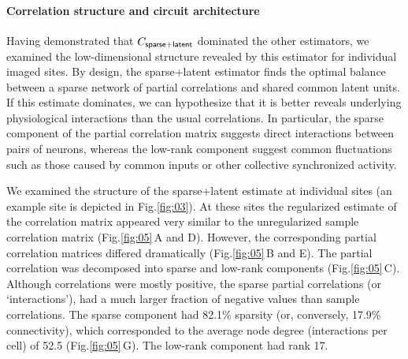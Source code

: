 \documentclass[10pt]{article}
\newcommand{\figref}[2]{Fig.\;\ref{fig:#1}\,#2}
\begin{document}
\paragraph{Correlation structure and circuit architecture}
Having demonstrated that $C_{\sf sparse+latent}$ dominated the other estimators, we examined the low-dimensional structure revealed by this estimator for individual imaged sites. By design, the sparse+latent estimator finds the optimal balance between a sparse network of partial correlations and shared common latent units. If this estimate dominates, we can hypothesize that it is better reveals underlying physiological interactions than the usual correlations. In particular, the sparse component of the partial correlation matrix suggests direct interactions between pairs of neurons, whereas the low-rank component suggest common fluctuations such as those caused by common inputs or other collective synchronized activity. 

We examined the structure of the sparse+latent estimate at individual sites (an example site is depicted in Fig.\;\ref{fig:03}). At these sites the regularized estimate of the correlation matrix appeared very similar to the unregularized sample correlation matrix (\figref{05}{A and D}). However, the corresponding partial correlation matrices differed dramatically (\figref{05}{B and E}). The partial correlation was decomposed into sparse and low-rank components (\figref{05}{C}). Although correlations were mostly positive, the sparse partial correlations (or `interactions'), had a much larger fraction of negative values than sample correlations. The sparse component had 82.1\% sparsity (or, conversely, 17.9\% connectivity), which corresponded to the average node degree (interactions per cell) of 52.5 (\figref{05}{G}). The low-rank component had rank 17.
\end{document}
